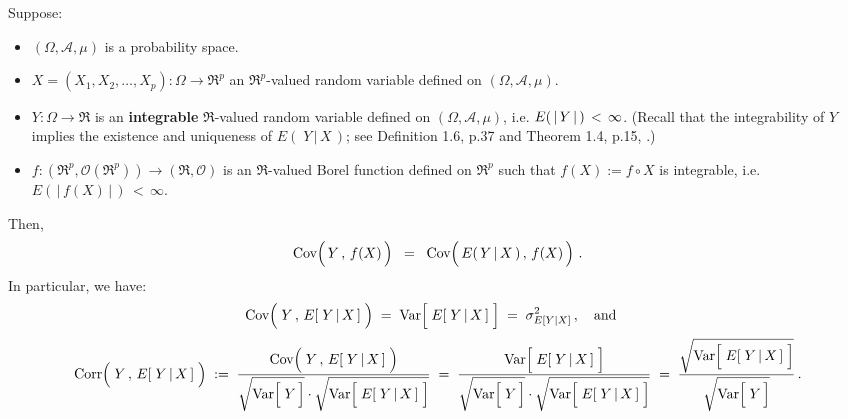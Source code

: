 \begin{proposition}
\label{Propn:CovarianceYFX}
\mbox{}
\vskip 0.2cm
\noindent
Suppose:
\begin{itemize}
\item
	$(\Omega,\mathcal{A},\mu)$ is a probability space.
\item
	$X = (X_{1}, X_{2}, \ldots, X_{p}) : \Omega \longrightarrow \Re^{p}$ an $\Re^{p}$-valued random variable
	defined on $(\Omega,\mathcal{A},\mu)$.
\item
	$Y : \Omega \longrightarrow \Re$ is an \textbf{\color{red}integrable} $\Re$-valued random variable
	defined on $(\Omega,\mathcal{A},\mu)$,
	i.e. $E(\,\vert\,\overset{{\color{white}.}}{Y}\,\vert\,)\,<\,\infty$.
	\vskip 0.01cm
	(Recall that the integrability of $Y$ implies the existence and uniqueness of $E\!\left(\;Y\,\vert\,X\,\right)$;
	see Definition 1.6, p.37 and Theorem 1.4, p.15, \cite{Shao2003}.)
\item
	$f : (\Re^{p},\mathcal{O}(\Re^{p})) \longrightarrow (\Re,\mathcal{O})$ is an $\Re$-valued Borel function
	defined on $\Re^{p}$ such that $f(X) := f\circ X$ is integrable, i.e. $E\!\left(\,\vert\,f(X)\,\vert\,\right) \,<\, \infty$.
\end{itemize}
Then,
\begin{equation*}
\Cov\!\left(\,\overset{{\color{white}.}}{Y}\,,\,f(X)\,\right)
\;\; = \;\;
\Cov\!\left(\,\overset{{\color{white}.}}{E}(\,Y\,\vert\,X\,)\,,\,f(X)\,\right)\,.
\end{equation*}
In particular, we have:
\begin{equation*}
\Cov\!\left(\;\overset{{\color{white}.}}{Y}\,,\,E[\;Y\,\vert\,X\,]\;\right)
	\; = \; \Var\!\left[\;\overset{{\color{white}.}}{E}[\;Y\,\vert\,X\,]\;\right]
	\; = \; \sigma^{2}_{E[Y\vert X]}\,,
\quad\textnormal{and}\quad
\end{equation*}
\begin{equation*}
\Corr\!\left(\;\overset{{\color{white}.}}{Y}\,,\,E[\;Y\,\vert\,X\,]\;\right)
	\; := \;
		\dfrac{
			\Cov\!\left(\;\overset{{\color{white}.}}{Y}\,,\,E[\;Y\,\vert\,X\,]\;\right)
			}{
			\sqrt{\Var\!\left[\;\overset{{\color{white}.}}{Y}\,\right]} \cdot \sqrt{\Var\!\left[\;\overset{{\color{white}.}}{E}[\;Y\,\vert\,X\,]\;\right]}
			}
	\; = \;
		\dfrac{
			\Var\!\left[\;\overset{{\color{white}.}}{E}[\;Y\,\vert\,X\,]\;\right]
			}{
			\sqrt{\Var\!\left[\;\overset{{\color{white}.}}{Y}\,\right]} \cdot \sqrt{\Var\!\left[\;\overset{{\color{white}.}}{E}[\;Y\,\vert\,X\,]\;\right]}
			}
	\; = \;
		\dfrac{
			\sqrt{\Var\!\left[\;\overset{{\color{white}.}}{E}[\;Y\,\vert\,X\,]\;\right]}
			}{
			\sqrt{\Var\!\left[\;\overset{{\color{white}.}}{Y}\,\right]}
			}\,.
\end{equation*}
\end{proposition}
